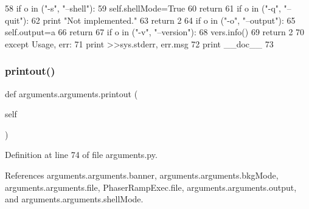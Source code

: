 \begin{DoxyCode}
58                 \textcolor{keywordflow}{if} o \textcolor{keywordflow}{in} (\textcolor{stringliteral}{"-s"}, \textcolor{stringliteral}{"--shell"}):
59                     self.shellMode=\textcolor{keyword}{True}
60                     \textcolor{keywordflow}{return}
61                 \textcolor{keywordflow}{if} o \textcolor{keywordflow}{in} (\textcolor{stringliteral}{"-q"}, \textcolor{stringliteral}{"--quit"}):
62                     \textcolor{keywordflow}{print} \textcolor{stringliteral}{"Not implemented."}
63                     \textcolor{keywordflow}{return} 2
64                 \textcolor{keywordflow}{if} o \textcolor{keywordflow}{in} (\textcolor{stringliteral}{"-o"}, \textcolor{stringliteral}{"--output"}):
65                     self.output=a
66                     \textcolor{keywordflow}{return}
67                 \textcolor{keywordflow}{if} o \textcolor{keywordflow}{in} (\textcolor{stringliteral}{"-v"}, \textcolor{stringliteral}{"--version"}):
68                     vers.info()
69                     \textcolor{keywordflow}{return} 2
70         \textcolor{keywordflow}{except} Usage, err:
71             \textcolor{keywordflow}{print} >>sys.stderr, err.msg
72             \textcolor{keywordflow}{print} \_\_doc\_\_
73 
\end{DoxyCode}
\mbox{\label{classarguments_1_1arguments_a772086f564c9ebb8e2955439c4d3dff1}} 
\subsubsection{\texorpdfstring{printout()}{printout()}}
{\footnotesize\ttfamily def arguments.\+arguments.\+printout (\begin{DoxyParamCaption}\item[{}]{self }\end{DoxyParamCaption})}



Definition at line 74 of file arguments.\+py.



References arguments.\+arguments.\+banner, arguments.\+arguments.\+bkg\+Mode, arguments.\+arguments.\+file, Phaser\+Ramp\+Exec.\+file, arguments.\+arguments.\+output, and arguments.\+arguments.\+shell\+Mode.


